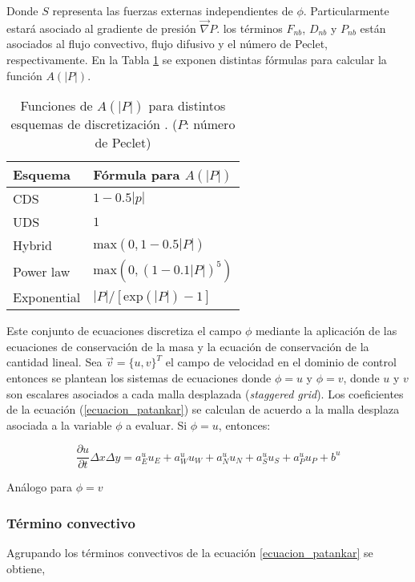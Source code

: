 Donde $S$ representa las fuerzas externas independientes de $\phi$. Particularmente estará asociado al gradiente de presión $\vec{\nabla} P$. los términos $F_{nb}$, $D_{nb}$ y $P_{nb}$ están asociados al flujo convectivo, flujo difusivo y el número de Peclet, respectivamente. En la Tabla \ref{tabla_patankar} se exponen distintas fórmulas para calcular la función $A(|P|)$. 

\begin{table} [H]
\centering
\begin{tabular}{|l|l|} \hline
Esquema & Fórmula para $A(|P|)$ \\ \hline \hline
CDS	&	$1-0.5|p|$	\\
UDS	&	$1$	\\
Hybrid	&	$\mbox{max}(0,1-0.5|P|)$	\\
Power law	&	$\mbox{max}(0,(1-0.1|P|)^5)$	\\
Exponential	&	$|P|/\left[ \mbox{exp}(|P|) -1 \right]$ \\ \hline
\end{tabular}
\caption{Funciones de $A(|P|)$ para distintos esquemas de discretización \cite{patankar}. ($P$: número de Peclet)} \label{tabla_patankar}
\end{table}

Este conjunto de ecuaciones discretiza el campo $\phi$ mediante la aplicación de las ecuaciones de conservación de la masa y la ecuación de conservación de la cantidad lineal. Sea $\vec{v} = \{u,v\}^T$ el campo de velocidad en el dominio de control entonces se plantean los sistemas de ecuaciones donde $\phi=u$ y $\phi=v$, donde $u$ y $v$ son escalares asociados a cada malla desplazada (\textit{staggered grid}). Los coeficientes de la ecuación (\ref{ecuacion_patankar}) se calculan de acuerdo a la malla desplaza asociada a la variable $\phi$ a evaluar. Si $\phi = u$, entonces:

\begin{equation}
\dfrac{\partial u}{\partial t} \Delta x \Delta y = a_E^u u_E + a_W^u u_W + a_N^u u_N + a_S^u u_S + a_P^u u_P + b^u
\end{equation} 

Análogo para $\phi = v$

\subsubsection{Término convectivo} \label{convectivo}

Agrupando los términos convectivos de la ecuación \ref{ecuacion_patankar} se obtiene,

